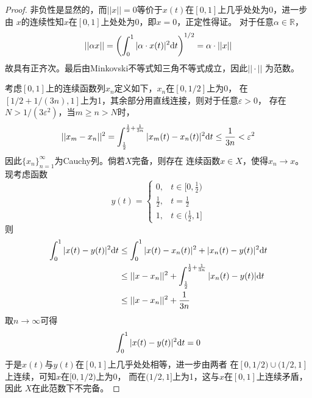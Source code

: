 \documentclass[cn]{homework}
\begin{document}
    \problem
    \begin{proof}
        非负性是显然的，而$||x||=0$等价于$x(t)$在$[0,1]$上几乎处处为0，进一步由
        $x$的连续性知$x$在$[0,1]$上处处为0，即$x=0$，正定性得证。
        对于任意$\alpha\in\mathbb R$，
        \[||\alpha x||=\left(\int_0^1|\alpha\cdot x(t)|^2\mathrm d t\right)^{1/2}
        =\alpha\cdot||x||\]
        故具有正齐次。最后由Minkovski不等式知三角不等式成立，因此$||\cdot||$
        为范数。
        
        考虑$[0,1]$上的连续函数列$x_n$定义如下，$x_n$在$[0,1/2]$上为0，
        在$[1/2+1/(3n),1]$上为1，其余部分用直线连接，则对于任意$\varepsilon>0$，
        存在$N>1/(3\varepsilon^2)$，当$m\geq n>N$时，
        \[\begin{aligned}
            ||x_m-x_n||^2=\int_{\frac{1}{2}}^{\frac{1}{2}+\frac{1}{3n}}
            |x_m(t)-x_n(t)|^2\mathrm d t
            \leq\frac{1}{3n}<\varepsilon^2
        \end{aligned}\]        
        因此$\{x_n\}_{n=1}^\infty$为Cauchy列。倘若$X$完备，则存在
        连续函数$x\in X$，使得$x_n\to x$。现考虑函数
        \[y(t)=\begin{cases}
            0,&t\in[0,\frac{1}{2})\\
            \frac{1}{2},&t=\frac{1}{2}\\
            1,&t\in(\frac{1}{2},1]
        \end{cases}\]
        则
        \[\begin{aligned}
            \int_0^1|x(t)-y(t)|^2\mathrm d t
            &\leq\int_0^1|x(t)-x_n(t)|^2+|x_n(t)-y(t)|^2\mathrm d t\\
            &\leq ||x-x_n||^2+\int_{\frac{1}{2}}^{\frac{1}{2}+\frac{1}{3n}}
             |x_n(t)-y(t)|\mathrm d t\\
            &\leq ||x-x_n||^2+\frac{1}{3n}
        \end{aligned}\]
        取$n\to\infty$可得
        \[\int_0^1|x(t)-y(t)|^2\mathrm d t=0\]
        于是$x(t)$与$y(t)$在$[0,1]$上几乎处处相等，进一步由两者
        在$[0,1/2)\cup (1/2,1]$上连续，可知$x$在$[0,1/2)$上为0，
        而在$(1/2,1]$上为1，这与$x$在$[0,1]$上连续矛盾，因此
        $X$在此范数下不完备。
    \end{proof}
\end{document}

